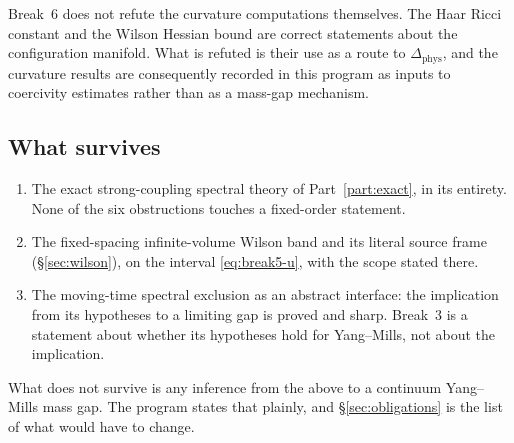 \begin{scopenote}
Break~6 does not refute the curvature computations themselves. The Haar
Ricci constant and the Wilson Hessian bound are correct statements about
the configuration manifold. What is refuted is their use as a route to
$\Delta_{\mathrm{phys}}$, and the curvature results are consequently
recorded in this program as inputs to coercivity estimates rather than
as a mass-gap mechanism.
\end{scopenote}

\subsection{What survives}

\begin{enumerate}
  \item The exact strong-coupling spectral theory of
    Part~\ref{part:exact}, in its entirety. None of the six obstructions
    touches a fixed-order statement.
  \item The fixed-spacing infinite-volume Wilson band and its literal
    source frame (\S\ref{sec:wilson}), on the interval
    \eqref{eq:break5-u}, with the scope stated there.
  \item The moving-time spectral exclusion as an abstract interface: the
    implication from its hypotheses to a limiting gap is proved and
    sharp. Break~3 is a statement about whether its hypotheses hold for
    Yang--Mills, not about the implication.
\end{enumerate}

What does not survive is any inference from the above to a continuum
Yang--Mills mass gap. The program states that plainly, and
\S\ref{sec:obligations} is the list of what would have to change.
